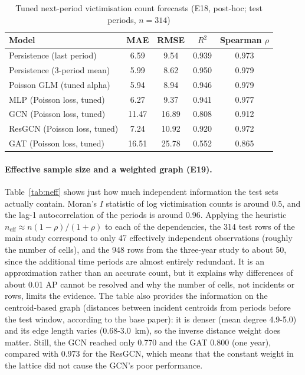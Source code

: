 \documentclass[11pt,a4paper]{report}
\begin{document}
\begin{table}[H]
\centering\small
\caption{Tuned next-period victimisation count forecasts (E18, post-hoc; test periods, $n=314$)}
\label{tab:count2}
\begin{tabular}{@{}lcccc@{}}
\toprule
Model & MAE & RMSE & $R^2$ & Spearman $\rho$\\
\midrule
Persistence (last period) & 6.59 & 9.54 & 0.939 & 0.973\\
Persistence (3-period mean) & 5.99 & 8.62 & 0.950 & 0.979\\
Poisson GLM (tuned alpha) & 5.94 & 8.94 & 0.946 & 0.979\\
MLP (Poisson loss, tuned) & 6.27 & 9.37 & 0.941 & 0.977\\
GCN (Poisson loss, tuned) & 11.47 & 16.89 & 0.808 & 0.912\\
ResGCN (Poisson loss, tuned) & 7.24 & 10.92 & 0.920 & 0.972\\
GAT (Poisson loss, tuned) & 16.51 & 25.78 & 0.552 & 0.865\\
\bottomrule
\end{tabular}
\end{table}

\paragraph{Effective sample size and a weighted graph (E19).} Table~\ref{tab:neff} shows just how much independent information the test sets actually contain. Moran's $I$ statistic of log victimisation counts is around 0.5, and the lag-1 autocorrelation of the periods is around 0.96. Applying the heuristic $n_{\text{eff}} \approx n(1 - \rho)/(1 + \rho)$ to each of the dependencies, the 314 test rows of the main study correspond to only 47 effectively independent observations (roughly the number of cells), and the 948 rows from the three-year study to about 50, since the additional time periods are almost entirely redundant. It is an approximation rather than an accurate count, but it explains why differences of about 0.01 AP cannot be resolved and why the number of cells, not incidents or rows, limits the evidence. The table also provides the information on the centroid-based graph (distances between incident centroids from periods before the test window, according to the base paper): it is denser (mean degree 4.9-5.0) and its edge length varies (0.68-3.0~km), so the inverse distance weight does matter. Still, the GCN reached only 0.770 and the GAT 0.800 (one year), compared with 0.973 for the ResGCN, which means that the constant weight in the lattice did not cause the GCN's poor performance.
\end{document}
